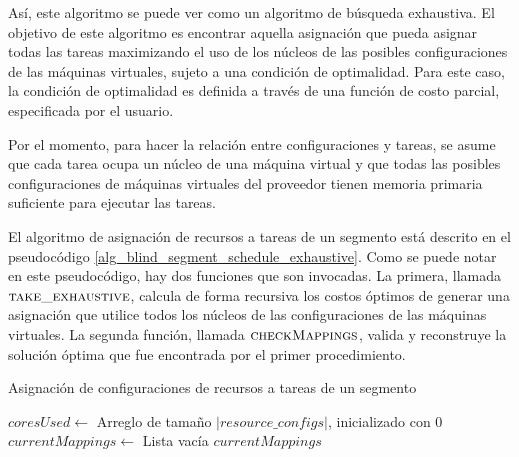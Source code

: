 
Así, este algoritmo se puede ver como un algoritmo de búsqueda exhaustiva. El objetivo de este algoritmo es encontrar aquella asignación que pueda asignar todas las tareas maximizando el uso de los núcleos de las posibles configuraciones de las máquinas virtuales, sujeto a una condición de optimalidad. Para este caso, la condición de optimalidad es definida a trav\'es de una funci\'on de costo parcial, especificada por el usuario. 

Por el momento, para hacer la relaci\'on entre configuraciones y tareas, se asume que cada tarea ocupa un núcleo de una máquina virtual y que todas las posibles configuraciones de máquinas virtuales del proveedor tienen memoria primaria suficiente para ejecutar las tareas.

El algoritmo de asignación de recursos a tareas de un segmento está descrito en el pseudocódigo \ref{alg_blind_segment_schedule_exhaustive}. Como se puede notar en este pseudocódigo, hay dos funciones que son invocadas. La primera, llamada $\Call{take\_exhaustive}{}$, calcula de forma recursiva los costos óptimos de generar una asignación que utilice todos los núcleos de las configuraciones de las máquinas virtuales. La segunda funci\'on, llamada $\Call{checkMappings}{}$, valida y reconstruye la soluci\'on \'optima que fue encontrada por el primer procedimiento.

\begin{algorithm}
\caption{Asignación de configuraciones de recursos a tareas de un segmento}
\label{alg_blind_segment_schedule_exhaustive}
\begin{algorithmic}[1]

	\State $coresUsed \gets$ Arreglo de tamaño $|resource\_configs|$, inicializado con 0
	\State $currentMappings \gets$ Lista vacía	
	\State {}
	\State \Return $currentMappings$
\EndProcedure
\end{algorithmic}
\end{algorithm}


